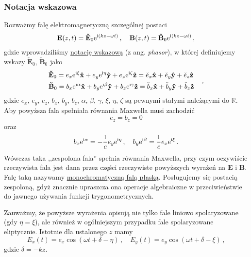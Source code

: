 \documentclass[../main.tex]{subfiles}
\begin{document}
\subsubsection{Notacja wskazowa}
Rozważmy falę elektromagnetyczną szczególnej postaci
\begin{equation*}
    \mathbf{E}(z,t)=\mathbf{\check E}_0\mathrm{e}^{\mathrm{i}(kz-\omega t)}\,,\quad \mathbf{B}(z,t)=\mathbf{\check B}_0\mathrm{e}^{\mathrm{i}(kz-\omega t)}\,,
\end{equation*}
gdzie wprowadziliśmy \underline{notację wskazową} (z ang. \textit{phasor}), w której definiujemy wskazy \({\mathbf{\check{E}}}_0\), \({\mathbf{\check{B}}}_0\) jako
\begin{equation*}
\begin{split}
    &\mathbf{\check{E}}_0=e_x\mathrm{e}^{\mathrm{i}\xi}\mathbf{\hat{x}}+e_y\mathrm{e}^{\mathrm{i}\eta}\mathbf{\hat{y}}+e_z\mathrm{e}^{\mathrm{i}\zeta}\mathbf{\hat{z}}=\check e_x\mathbf{\hat x}+\check e_y\mathbf{\hat y}+\check e_z\mathbf{\hat z}\\
    &\mathbf{\check{B}}_0=b_x\mathrm{e}^{\mathrm{i}\alpha}\mathbf{\hat{x}}+b_y\mathrm{e}^{\mathrm{i}\beta}\mathbf{\hat{y}}+b_z\mathrm{e}^{\mathrm{i}\gamma}\mathbf{\hat{z}}=\check b_x\mathbf{\hat x}+\check b_y\mathbf{\hat y}+\check b_z\mathbf{\hat z}
\end{split}\quad\,,
\end{equation*}
gdzie \(e_x\), \(e_y\), \(e_z\), \(b_x\), \(b_y\), \(b_z\), \(\alpha\), \(\beta\), \(\gamma\), \(\xi\), \(\eta\), \(\zeta\) są pewnymi stałymi należącymi do \(\mathbb{R}\). Aby powyższa fala spełniała równania Maxwella musi zachodzić
\begin{equation*}
    e_z=b_z=0
\end{equation*}
oraz
\begin{equation*}
    b_x\mathrm{e}^{\mathrm{i}\alpha}=-\frac{1}{c}e_y\mathrm{e}^{\mathrm{i}\eta}\,,\quad b_y\mathrm{e}^{\mathrm{i}\beta}=\frac{1}{c}e_x\mathrm{e}^{\mathrm{i}\xi}\,.
\end{equation*}
Wówczas taka ,,zespolona fala'' spełnia równania Maxwella, przy czym oczywiście rzeczywista fala jest dana przez części rzeczywiste powyższych wyrażeń na \(\mathbf{E}\) i \(\mathbf{B}\). Falę taką nazywamy \underline{monochromatyczną falą płaską}. Posługujemy się postacią zespoloną, gdyż znacznie upraszcza ona operacje algebraiczne w przeciwieństwie do jawnego używania funkcji trygonometrycznych.
\medskip

Zauważmy, że powyższe wyrażenia opisują nie tylko fale liniowo spolaryzowane (gdy \(\eta=\xi\)), ale również w ogólniejszym przypadku fale spolaryzowane eliptycznie. Istotnie dla ustalonego \(z\) mamy
\begin{equation*}
    E_x(t)=e_x\cos(\omega t+\delta-\eta)\,,\quad E_y(t)=e_y\cos(\omega t+\delta-\xi)\,,
\end{equation*}
gdzie \(\delta =-kz\).
\medskip
\end{document}
